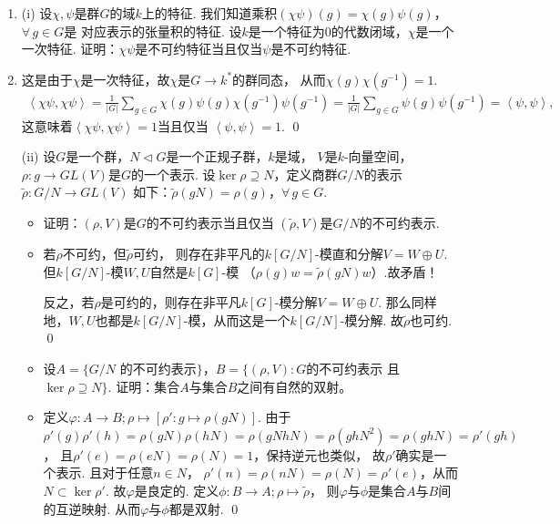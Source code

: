 \begin{enumerate}
    \item[11.4] (i) 设$\chi,\psi$是群$G$的域$k$上的特征.
    我们知道乘积$(\chi\psi)(g) = \chi(g)\psi(g)$，$\forall \, g \in G$是
    对应表示的张量积的特征.
    设$k$是一个特征为$0$的代数闭域，$\chi$是一个一次特征. 
    证明：$\chi\psi$是不可约特征当且仅当$\psi$是不可约特征.
    \item[\textbf{证明:}]
    这是由于$\chi$是一次特征，故$\chi$是$G \rightarrow k^{*}$的群同态，
    从而$\chi(g)\chi(g^{-1})=1$.
    \begin{equation*}\begin{aligned}
    \left<\chi\psi,\chi\psi\right> 
    = \frac{1}{|G|}\sum_{g \in G}\chi(g)\psi(g)\chi(g^{-1})\psi(g^{-1})
    = \frac{1}{|G|}\sum_{g \in G}\psi(g)\psi(g^{-1})
    = \left<\psi,\psi\right>, 
    \end{aligned}\end{equation*}
    这意味着$\left<\chi\psi,\chi\psi\right> = 1$当且仅当
    $\left<\psi,\psi\right> = 1$. \qed

    (ii) 设$G$是一个群，$N \lhd G$是一个正规子群，$k$是域，
    $V$是$k$-向量空间，$\rho:g \rightarrow GL(V)$是$G$的一个表示.
    设$\ker \rho \supseteq N$，定义商群$G/N$的表示
    $\widetilde{\rho}:G/N \rightarrow GL(V)$
    如下：$\widetilde{\rho}(gN) = \rho(g)$，$\forall \, g \in G$.
    \begin{itemize}
        \item[(1)] 证明：$(\rho,V)$是$G$的不可约表示当且仅当
        $(\widetilde{\rho},V)$是$G/N$的不可约表示.
        \item[\textbf{证明:}]
        若$\rho$不可约，但$\widetilde{\rho}$可约，
        则存在非平凡的$k[G/N]$-模直和分解$V = W \oplus U$.
        但$k[G/N]$-模$W,U$自然是$k[G]$-模
        （$\rho(g)w = \widetilde{\rho}(gN)w$）.故矛盾！

        反之，若$\rho$是可约的，则存在非平凡$k[G]$-模分解$V = W \oplus U$.
        那么同样地，$W,U$也都是$k[G/N]$-模，从而这是一个$k[G/N]$-模分解. 
        故$\widetilde{\rho}$也可约. \qed

        \item[(2)] 设$A=\{G/N\text{ 的不可约表示}\}$，$B=\{(\rho,V):G$的不可约表示
        且$\ker\rho\supseteq N\}$. 证明：集合$A$与集合$B$之间有自然的双射。
        \item[\textbf{证明:}]
        定义$\varphi:A \rightarrow B;\rho \mapsto [\rho':g \mapsto \rho(gN)]$.
        由于$\rho'(g)\rho'(h) = \rho(gN)\rho(hN)
        = \rho(gNhN) = \rho(ghN^{2}) = \rho(ghN) = \rho'(gh)$，
        且$\rho'(e) = \rho(eN) = \rho(N) = 1$，保持逆元也类似，
        故$\rho'$确实是一个表示.  且对于任意$n \in N$，
        $\rho'(n) = \rho(nN) = \rho(N) = \rho'(e)$，从而$N \subset \ker \rho'$.
        故$\varphi$是良定的.
        定义$\phi:B \rightarrow A;\rho \mapsto \widetilde{\rho}$，
        则$\varphi$与$\phi$是集合$A$与$B$间的互逆映射.
        从而$\varphi$与$\phi$都是双射. \qed
    \end{itemize}


\end{enumerate}
